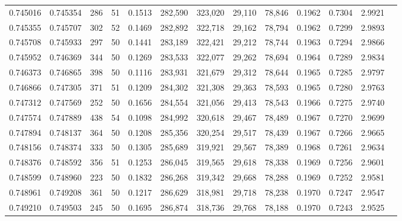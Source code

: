\begin{tabular}{rrrrrrrrrrrrr}
0.745016 & 0.745354 &   286 &  51 &                                     0.1513 & 282,590 & 323,020 &  29,110 &  78,846 & 0.1962 & 0.7304 & 2.9921 \\
0.745355 & 0.745707 &   302 &  52 &                                     0.1469 & 282,892 & 322,718 &  29,162 &  78,794 & 0.1962 & 0.7299 & 2.9893 \\
0.745708 & 0.745933 &   297 &  50 &                                     0.1441 & 283,189 & 322,421 &  29,212 &  78,744 & 0.1963 & 0.7294 & 2.9866 \\
0.745952 & 0.746369 &   344 &  50 &                                     0.1269 & 283,533 & 322,077 &  29,262 &  78,694 & 0.1964 & 0.7289 & 2.9834 \\
0.746373 & 0.746865 &   398 &  50 &                                     0.1116 & 283,931 & 321,679 &  29,312 &  78,644 & 0.1965 & 0.7285 & 2.9797 \\
0.746866 & 0.747305 &   371 &  51 &                                     0.1209 & 284,302 & 321,308 &  29,363 &  78,593 & 0.1965 & 0.7280 & 2.9763 \\
0.747312 & 0.747569 &   252 &  50 &                                     0.1656 & 284,554 & 321,056 &  29,413 &  78,543 & 0.1966 & 0.7275 & 2.9740 \\
0.747574 & 0.747889 &   438 &  54 &                                     0.1098 & 284,992 & 320,618 &  29,467 &  78,489 & 0.1967 & 0.7270 & 2.9699 \\
0.747894 & 0.748137 &   364 &  50 &                                     0.1208 & 285,356 & 320,254 &  29,517 &  78,439 & 0.1967 & 0.7266 & 2.9665 \\
0.748156 & 0.748374 &   333 &  50 &                                     0.1305 & 285,689 & 319,921 &  29,567 &  78,389 & 0.1968 & 0.7261 & 2.9634 \\
0.748376 & 0.748592 &   356 &  51 &                                     0.1253 & 286,045 & 319,565 &  29,618 &  78,338 & 0.1969 & 0.7256 & 2.9601 \\
0.748599 & 0.748960 &   223 &  50 &                                     0.1832 & 286,268 & 319,342 &  29,668 &  78,288 & 0.1969 & 0.7252 & 2.9581 \\
0.748961 & 0.749208 &   361 &  50 &                                     0.1217 & 286,629 & 318,981 &  29,718 &  78,238 & 0.1970 & 0.7247 & 2.9547 \\
0.749210 & 0.749503 &   245 &  50 &                                     0.1695 & 286,874 & 318,736 &  29,768 &  78,188 & 0.1970 & 0.7243 & 2.9525 \\

\end{tabular}
